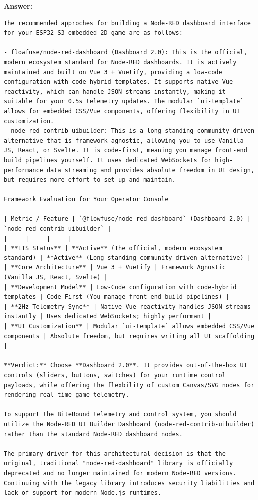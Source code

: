 \textbf{Answer:}
\begin{lstlisting}[language={}, breaklines=true]
The recommended approches for building a Node-RED dashboard interface for your ESP32-S3 embedded 2D game are as follows:

- flowfuse/node-red-dashboard (Dashboard 2.0): This is the official, modern ecosystem standard for Node-RED dashboards. It is actively maintained and built on Vue 3 + Vuetify, providing a low-code configuration with code-hybrid templates. It supports native Vue reactivity, which can handle JSON streams instantly, making it suitable for your 0.5s telemetry updates. The modular `ui-template` allows for embedded CSS/Vue components, offering flexibility in UI customization.
- node-red-contrib-uibuilder: This is a long-standing community-driven alternative that is framework agnostic, allowing you to use Vanilla JS, React, or Svelte. It is code-first, meaning you manage front-end build pipelines yourself. It uses dedicated WebSockets for high-performance data streaming and provides absolute freedom in UI design, but requires more effort to set up and maintain.

Framework Evaluation for Your Operator Console

| Metric / Feature | `@flowfuse/node-red-dashboard` (Dashboard 2.0) | `node-red-contrib-uibuilder` |
| --- | --- | --- |
| **LTS Status** | **Active** (The official, modern ecosystem standard) | **Active** (Long-standing community-driven alternative) |
| **Core Architecture** | Vue 3 + Vuetify | Framework Agnostic (Vanilla JS, React, Svelte) |
| **Development Model** | Low-Code configuration with code-hybrid templates | Code-First (You manage front-end build pipelines) |
| **2Hz Telemetry Sync** | Native Vue reactivity handles JSON streams instantly | Uses dedicated WebSockets; highly performant |
| **UI Customization** | Modular `ui-template` allows embedded CSS/Vue components | Absolute freedom, but requires writing all UI scaffolding |

**Verdict:** Choose **Dashboard 2.0**. It provides out-of-the-box UI controls (sliders, buttons, switches) for your runtime control payloads, while offering the flexbility of custom Canvas/SVG nodes for rendering real-time game telemetry.

To support the BiteBound telemetry and control system, you should utilize the Node-RED UI Builder Dashboard (node-red-contrib-uibuilder) rather than the standard Node-RED dashboard nodes.

The primary driver for this architectural decision is that the original, traditional "node-red-dashboard" library is officially deprecated and no longer maintained for modern Node-RED versions. Continuing with the legacy library introduces security liabilities and lack of support for modern Node.js runtimes.


\end{lstlisting}
